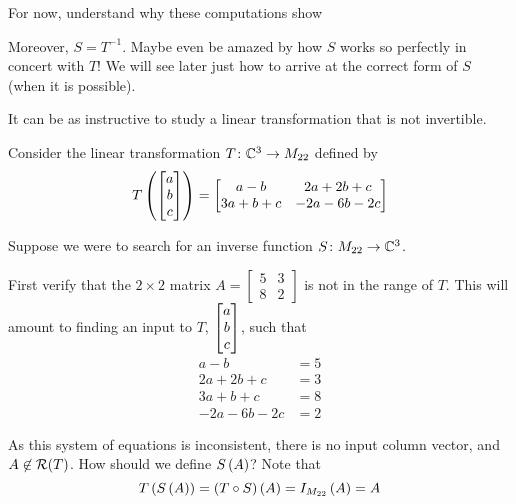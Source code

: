 \documentclass{ximera}
\begin{document}
\begin{example}
For now, understand why these computations show
\begin{multipleChoice}
\end{multipleChoice}

\begin{feedback}[correct]
Moreover, $S=T^{-1}$.  Maybe even be amazed by how $S$ works so perfectly in concert with $T$!  We will see later just how to arrive at the correct form of $S$ (when it is possible).
\end{feedback}

\end{example}

It can be as instructive to study a linear transformation that is not invertible.

\begin{example}

Consider the linear transformation $T\colon \mathbb{C}^{3}\rightarrow M_{22}$ defined by
\[
T\left(\begin{bmatrix}a\\b\\c\end{bmatrix}\right)=\begin{bmatrix}
a-b&2a+2b+c\\3a+b+c&-2a-6b-2c
\end{bmatrix}
\]


Suppose we were to search for an inverse function $S\colon M_{22}\rightarrow\mathbb{C}^{3}$.



First verify that the $2\times 2$ matrix
$A=\begin{bmatrix}
5&3\\8&2
\end{bmatrix}
$
is not in the range of $T$.  This will amount to finding an input to $T$, $\begin{bmatrix}a\\b\\c\end{bmatrix}$, such that
\begin{align*}
a-b&=5\\
2a+2b+c&=3\\
3a+b+c&=8\\
-2a-6b-2c&=2
\end{align*}




As this system of equations is inconsistent, there is no input column vector, and $A\not\in\mathcal{R}\!\left(T\right)$.  How should we define $S\left(A\right)$?  Note that
\[
T\left(S\left(A\right)\right)=\left({T}\circ{S}\right)\left(A\right)=
I_{M_{22}}\left(A\right)=A
\]





\end{example}
\end{document}
